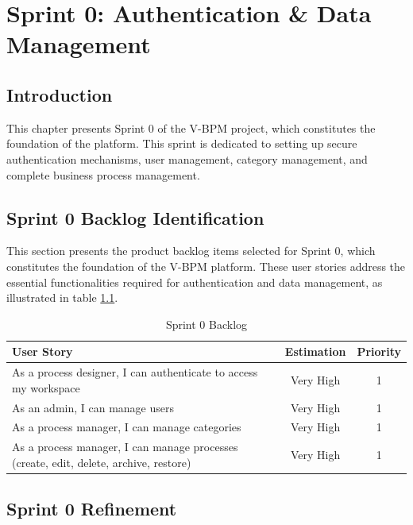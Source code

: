 \chapter{Sprint 0: Authentication \& Data Management}

\section{Introduction}

This chapter presents Sprint 0 of the V-BPM project, which constitutes the foundation of the platform. This sprint is dedicated to setting up secure authentication mechanisms, user management, category management, and complete business process management.

\section{Sprint 0 Backlog Identification}

This section presents the product backlog items selected for Sprint 0, which constitutes the foundation of the V-BPM platform. These user stories address the essential functionalities required for authentication and data management, as illustrated in table \ref{tab:backlog-sprint0}.

\begin{table}[H]
\centering
\caption{Sprint 0 Backlog}
\label{tab:backlog-sprint0}
\begin{tabular}{|p{11cm}|c|c|}
\hline
\textbf{User Story} & \textbf{Estimation} & \textbf{Priority} \\
\hline
As a process designer, I can authenticate to access my workspace & Very High & 1 \\
\hline
As an admin, I can manage users & Very High & 1 \\
\hline
As a process manager, I can manage categories & Very High & 1 \\
\hline
As a process manager, I can manage processes (create, edit, delete, archive, restore) & Very High & 1 \\
\hline
\end{tabular}
\end{table}

\section{Sprint 0 Refinement}

